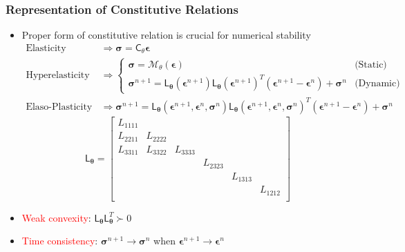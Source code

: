 \documentclass[usenames,dvipsnames]{beamer}
\newcommand{\ChoL}{\mathsf{L}}
\newcommand{\bt}[0]{\bm{\theta}}
\begin{document}
\begin{frame}
	\frametitle{Representation of Constitutive Relations}
	\begin{itemize}
		\item Proper form of constitutive relation is crucial for numerical stability
		{\footnotesize\begin{align*}
				\mbox{Elasticity} &\Rightarrow \bm\sigma = \mathsf{C}_{\theta}\bm\epsilon \\
				\mbox{Hyperelasticity } &\Rightarrow \begin{cases}\bm\sigma =\mathcal{M}_{\theta}(\bm\epsilon) & \mbox{(Static)} \\
					\bm{\sigma}^{n+1}  =  \ChoL_{\bt}(\bm\epsilon^{n+1}) \ChoL_{\bt}(\bm\epsilon^{n+1})^T (\bm{\epsilon}^{n+1} - \bm{\epsilon}^{n})  + \bm{\sigma}^{n}  & \mbox{(Dynamic)} \end{cases} \\
				\mbox{Elaso-Plasticity} &\Rightarrow \bm\sigma^{n+1} = \ChoL_{\bt}(\bm\epsilon^{n+1},\bm{\epsilon}^{n},\bm{\sigma}^{n}) \ChoL_{\bt}(\bm\epsilon^{n+1},\bm{\epsilon}^{n},\bm{\sigma}^{n})^T (\bm{\epsilon}^{n+1} - \bm{\epsilon}^{n})  + \bm{\sigma}^{n} 
			\end{align*}
		}{\footnotesize$$\ChoL_{\bt} = \begin{bmatrix}
				L_{1111}  &  & &  &       &\\
				L_{2211}  & L_{2222} & &   & &\\
				L_{3311}  &  L_{3322}               & L_{3333} &  & &\\
				&                 &                 & L_{2323}&  &\\
				&               &                  &                & L_{1313} &\\
				&                 &                  &                &                 &L_{1212}\\
			\end{bmatrix}$$}
		\item \textcolor{red}{Weak convexity}: $\ChoL_{\bt}\ChoL_{\bt}^T \succ 0$
		\item \textcolor{red}{Time consistency}:  $\bm\sigma^{n+1} \rightarrow \bm \sigma^n$ when $\bm\epsilon^{n+1} \rightarrow \bm \epsilon^n$
	\end{itemize}
	
\end{frame}
\end{document}
